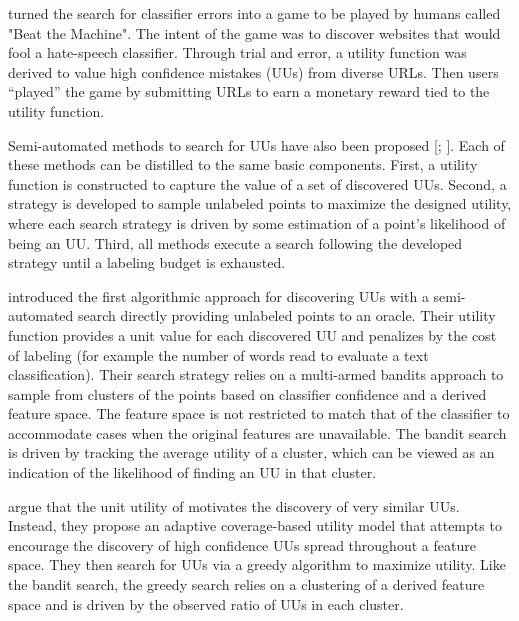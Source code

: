 \documentclass[letterpaper]{article} %
\begin{document}
\citet{Attenberg2015} turned the search for classifier errors into a game to be played by humans called "Beat the Machine". The intent of the game was to discover websites that would fool a hate-speech classifier. Through trial and error, a utility function was derived to value high confidence mistakes (UUs) from diverse URLs. Then users ``played'' the game by submitting URLs to earn a monetary reward tied to the utility function. 

Semi-automated methods to search for UUs have also been proposed [\citealt{Lakkaraju2016}; \citealt{Bansal2018}].  Each of these methods can be distilled to the same basic components.  First, a utility function is constructed to capture the value of a set of discovered UUs. Second, a strategy is developed to sample unlabeled points to maximize the designed utility, where each search strategy is driven by some estimation of a point's likelihood of being an UU.  Third, all methods execute a search following the developed strategy until a labeling budget is exhausted.

\citet{Lakkaraju2016} introduced the first algorithmic approach for discovering UUs with a semi-automated search directly providing unlabeled points to an oracle.  Their utility function provides a unit value for each discovered UU and penalizes by the cost of labeling (for example the number of words read to evaluate a text classification). Their search strategy relies on a multi-armed bandits approach to sample from clusters of the points based on classifier confidence and a derived feature space.  The feature space is not restricted to match that of the classifier to accommodate cases when the original features are unavailable.  The bandit search is driven by tracking the average utility of a cluster, which can be viewed as an indication of the likelihood of finding an UU in that cluster. 

\citet{Bansal2018} argue that the unit utility of \citet{Lakkaraju2016} motivates the discovery of very similar UUs. Instead, they propose an adaptive coverage-based utility model that attempts to encourage the discovery of high confidence UUs spread throughout a feature space. They then search for UUs via a greedy algorithm to maximize utility.  Like the bandit search, the greedy search relies on a clustering of a derived feature space and is driven by the observed ratio of UUs in each cluster. 
\end{document}
